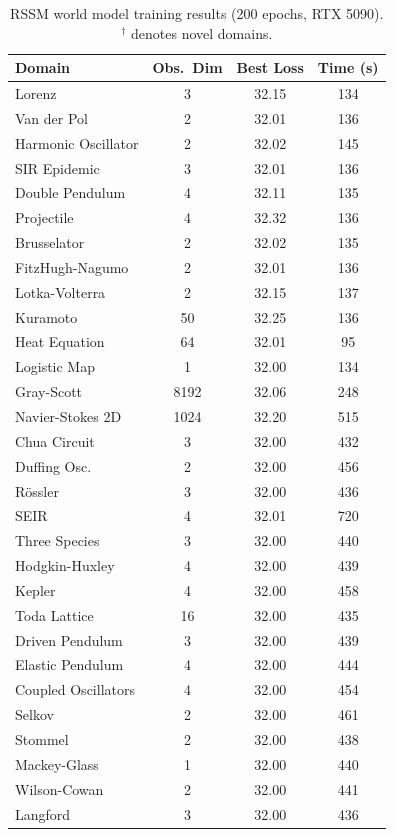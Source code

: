 \documentclass{article}
\begin{document}
\begin{table}[h]
\centering
\caption{RSSM world model training results (200 epochs, RTX 5090). $^\dagger$ denotes novel domains.}
\label{tab:world_models}
\begin{tabular}{lccc}
\toprule
Domain & Obs.\ Dim & Best Loss & Time (s) \\
\midrule
Lorenz & 3 & 32.15 & 134 \\
Van der Pol & 2 & 32.01 & 136 \\
Harmonic Oscillator & 2 & 32.02 & 145 \\
SIR Epidemic & 3 & 32.01 & 136 \\
Double Pendulum & 4 & 32.11 & 135 \\
Projectile & 4 & 32.32 & 136 \\
Brusselator & 2 & 32.02 & 135 \\
FitzHugh-Nagumo & 2 & 32.01 & 136 \\
Lotka-Volterra & 2 & 32.15 & 137 \\
Kuramoto & 50 & 32.25 & 136 \\
Heat Equation & 64 & 32.01 & 95 \\
Logistic Map & 1 & 32.00 & 134 \\
Gray-Scott & 8192 & 32.06 & 248 \\
Navier-Stokes 2D & 1024 & 32.20 & 515 \\
\midrule
Chua Circuit & 3 & 32.00 & 432 \\
Duffing Osc. & 2 & 32.00 & 456 \\
R\"ossler & 3 & 32.00 & 436 \\
\midrule
SEIR & 4 & 32.01 & 720 \\
Three Species & 3 & 32.00 & 440 \\
Hodgkin-Huxley & 4 & 32.00 & 439 \\
Kepler & 4 & 32.00 & 458 \\
Toda Lattice & 16 & 32.00 & 435 \\
Driven Pendulum & 3 & 32.00 & 439 \\
Elastic Pendulum & 4 & 32.00 & 444 \\
Coupled Oscillators & 4 & 32.00 & 454 \\
Selkov & 2 & 32.00 & 461 \\
Stommel & 2 & 32.00 & 438 \\
Mackey-Glass & 1 & 32.00 & 440 \\
Wilson-Cowan & 2 & 32.00 & 441 \\
Langford & 3 & 32.00 & 436 \\
\midrule

\end{tabular}
\end{table}
\end{document}
